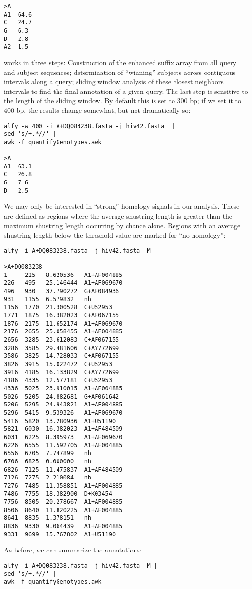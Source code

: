 \documentclass[a4paper]{article}
\begin{document}
\begin{itemize}
\begin{verbatim}
>A
A1  64.6
C   24.7
G   6.3
D   2.8
A2  1.5
\end{verbatim}
\I {} works in three steps:
\be
\I Construction of the enhanced suffix array from all query and
subject sequences;
\I determination of ``winning'' subjects across contiguous intervals
along a query;
\I sliding window analysis of these closest neighbors intervals to
find the final annotation of a given query.
\ee
The last step is sensitive to the length of the sliding window. By
default this is set to 300 bp; if we set it to 400 bp, the results
change somewhat, but not dramatically so:
\begin{verbatim}
alfy -w 400 -i A+DQ083238.fasta -j hiv42.fasta  | 
sed 's/+.*//' | 
awk -f quantifyGenotypes.awk

>A
A1  63.1
C   26.8
G   7.6
D   2.5
\end{verbatim}
\I We may only be interested in ``strong'' homology signals in our
analysis. These are defined as regions where the average shustring
length is greater than the maximum shustring length occurring by chance
alone. Regions with an average shustring length below the threshold value are
marked   for ``no homology'':
\begin{verbatim}
alfy -i A+DQ083238.fasta -j hiv42.fasta -M

>A+DQ083238
1     225   8.620536   A1+AF004885
226   495   25.146444  A1+AF069670
496   930   37.790272  G+AF084936
931   1155  6.579832   nh
1156  1770  21.300528  C+U52953
1771  1875  16.382023  C+AF067155
1876  2175  11.652174  A1+AF069670
2176  2655  25.058455  A1+AF004885
2656  3285  23.612083  C+AF067155
3286  3585  29.481606  C+AY772699
3586  3825  14.728033  C+AF067155
3826  3915  15.022472  C+U52953
3916  4185  16.133829  C+AY772699
4186  4335  12.577181  C+U52953
4336  5025  23.910015  A1+AF004885
5026  5205  24.882681  G+AF061642
5206  5295  24.943821  A1+AF004885
5296  5415  9.539326   A1+AF069670
5416  5820  13.280936  A1+U51190
5821  6030  16.382023  A1+AF484509
6031  6225  8.395973   A1+AF069670
6226  6555  11.592705  A1+AF004885
6556  6705  7.747899   nh
6706  6825  0.000000   nh
6826  7125  11.475837  A1+AF484509
7126  7275  2.210084   nh
7276  7485  11.358851  A1+AF004885
7486  7755  18.382900  D+K03454
7756  8505  20.278667  A1+AF004885
8506  8640  11.820225  A1+AF004885
8641  8835  1.378151   nh
8836  9330  9.064439   A1+AF004885
9331  9699  15.767802  A1+U51190
\end{verbatim}
\I As before, we can summarize the annotations:
\begin{verbatim}
alfy -i A+DQ083238.fasta -j hiv42.fasta -M |
sed 's/+.*//' | 
awk -f quantifyGenotypes.awk


\end{verbatim}
\end{itemize}
\end{document}
